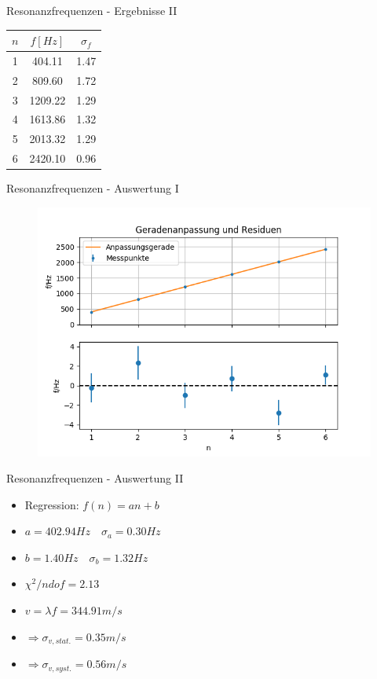 \documentclass[12pt]{beamer}
\begin{document}
	\begin{frame}{Resonanzfrequenzen - Ergebnisse II}
	\begin{table}
	\begin{tabular}{|c|c|c|}
	\hline 
	$n$ & $f[Hz]$ & $\sigma_f$ \\ 
	\hline 
	1 & 404.11 & 1.47 \\ 
	\hline 
	2 & 809.60 & 1.72 \\ 
	\hline 
	3 & 1209.22 & 1.29 \\ 
	\hline 
	4 & 1613.86 & 1.32 \\ 
	\hline 
	5 & 2013.32 & 1.29 \\ 
	\hline 
	6 & 2420.10 & 0.96 \\ 
	\hline
	\end{tabular} 
	\end{table}
	\end{frame}
	
	\begin{frame}{Resonanzfrequenzen - Auswertung I}
	\begin{figure}
	\includegraphics[width=\linewidth , height=0.75\textheight]{fitplot}
	\end{figure}
	\end{frame}
	
	\begin{frame}{Resonanzfrequenzen - Auswertung II}
	\begin{itemize}
	\item Regression: $f(n)=a n+b$
	\item $a=402.94Hz \quad \sigma_a=0.30Hz$
	\item $b=1.40Hz \quad \sigma_b=1.32Hz$
	\item $\chi^2/ndof=2.13$
	\item $v=\lambda f = 344.91m/s$
	\item $\Rightarrow \sigma_{v,stat.}=0.35m/s$
	\item $\Rightarrow \sigma_{v,syst.}=0.56m/s$
	\end{itemize}
	\end{frame}
	
\end{document}

